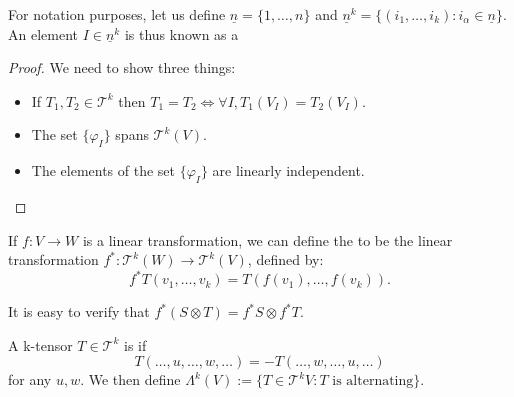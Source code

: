 \documentclass{article}
\numberwithin{equation}{section}
\begin{document}
For notation purposes, let us define $\underline{n} = \{1,\dots,n\}$ and $\underline{n}^k = \{(i_1,\dots,i_k) : i_\alpha \in \underline{n}\}.$ An element $I \in \underline{n}^k$ is thus known as a 
\begin{proof}
    We need to show three things:
    \begin{itemize}
        \item If $T_1,T_2 \in \mathcal{T}^k$ then $T_1=T_2 \iff \forall I, T_1(V_I) = T_2(V_I)$.
        \item The set $\{\varphi_I\}$ spans $\mathcal{T}^k(V).$
        \item The elements of the set $\{\varphi_I\}$ are linearly independent.
    \end{itemize}
\end{proof}
\begin{definition}
    If $f:V\to W$ is a linear transformation, we can define the  to be the linear transformation $f^*: \mathcal{T}^k(W) \rightarrow \mathcal{T}^k(V)$, defined by:
    \begin{equation}
        f^*T(v_1,\dots,v_k) = T(f(v_1),\dots,f(v_k)).
    \end{equation}
\end{definition}
It is easy to verify that $f^*(S\otimes T) = f^*S \otimes f^*T.$
\begin{definition}
    A k-tensor $T\in \mathcal{T}^k$ is  if
    \begin{equation}
        T(\dots,u,\dots,w,\dots) = -T(\dots,w,\dots,u,\dots)
    \end{equation}
    for any $u,w.$ We then define $\Lambda^k(V) := \{T \in \mathcal{T}^kV: T\text{ is alternating}\}.$
\end{definition}
\end{document}
